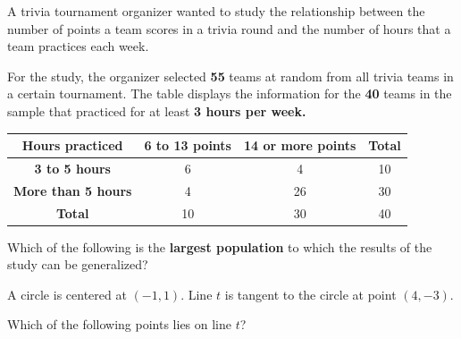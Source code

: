 
\vspace{2em}
\newpage

\noindent\markforreview
\vspace{1em}

A trivia tournament organizer wanted to study the relationship between the number of points a team scores in a trivia round and the number of hours that a team practices each week.

For the study, the organizer selected \textbf{55} teams at random from all trivia teams in a certain tournament. The table displays the information for the \textbf{40} teams in the sample that practiced for at least \textbf{3 hours per week.}

\begin{center}
\begin{tabular}{|c|c|c|c|}
\hline
\textbf{Hours practiced} & \textbf{6 to 13 points} & \textbf{14 or more points} & \textbf{Total} \\
\hline
\textbf{3 to 5 hours} & 6 & 4 & 10 \\
\textbf{More than 5 hours} & 4 & 26 & 30 \\
\hline
\textbf{Total} & 10 & 30 & 40 \\
\hline
\end{tabular}
\end{center}

Which of the following is the \textbf{largest population} to which the results of the study can be generalized?

\vspace{0.75em}


\vspace{2em}
\newpage

\noindent\markforreview
\vspace{1em}

A circle is centered at \((-1,1)\). Line \(t\) is tangent to the circle at point \((4,-3)\).

Which of the following points lies on line \(t\)?

\vspace{0.75em}

